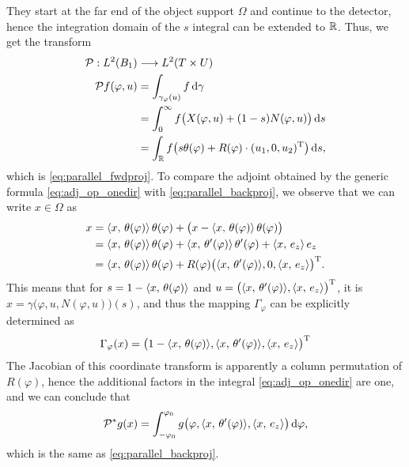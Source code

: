 \documentclass{amsart}
\renewcommand*{\phi}{\varphi}
\begin{document}
\begin{example}
\begin{equation*}
 \end{equation*}
 They start at the far end of the object support $\Omega$ and continue to the detector, hence the integration domain of the $s$ 
 integral can be extended to ${\mathbb{R}}$. Thus, we get the transform
 \begin{align*}
  \OPP: L^2(B_1) & \Lto L^2(T \times U) \\
  \OPP f(\phi, u) 
  &= \int_{\gamma_\phi(u)} f\, \D \gamma \\
  &= \int_0^\infty f\big(X(\phi, u) + (1-s) N(\phi, u)\big)\, \D s \\
  &= \int_\RR f\big(s \theta(\phi) + R(\phi) \cdot \TRANSP{(u_1, 0, u_2)}\big)\, \D s,
 \end{align*}
 which is \eqref{eq:parallel_fwdproj}. To compare the adjoint obtained by the generic formula \eqref{eq:adj_op_onedir} with 
 \eqref{eq:parallel_backproj}, we observe that we can write $x \in \Omega$ as
 \begin{align*}
  x 
  &= \INNER{x}{\theta(\phi)}\, \theta(\phi) + \big(x - \INNER{x}{\theta(\phi)}\, \theta(\phi)\big) \\
  &= \INNER{x}{\theta(\phi)}\, \theta(\phi) + \INNER{x}{\theta'(\phi)}\, \theta'(\phi) + \INNER{x}{e_z}\, e_z \\
  &= \INNER{x}{\theta(\phi)}\, \theta(\phi) + R(\phi) \TRANSP{\big(\INNER{x}{\theta'(\phi)}, 0, \INNER{x}{e_z}\big)}.
 \end{align*}
 This means that for $s = 1 - \INNER{x}{\theta(\phi)}$ and $u = \TRANSP{\big(\INNER{x}{\theta'(\phi)}, \INNER{x}{e_z}\big)}$, it is 
 $x = \gamma\big(\phi, u, N(\phi, u)\big)(s)$, and thus the mapping $\Gamma_\phi$ can be explicitly determined as
 \begin{equation*}
  \Gamma_\phi(x) = \TRANSP{\big(1 - \INNER{x}{\theta(\phi)}, \INNER{x}{\theta'(\phi)}, \INNER{x}{e_z}\big)}
 \end{equation*}
 The Jacobian of this coordinate transform is apparently a column permutation of $R(\phi)$, hence the additional factors in the integral 
 \eqref{eq:adj_op_onedir} are one, and we can conclude that
 \begin{equation*}
  \DUALOPP g(x) = \int_{-\phi_0}^{\phi_0} g\big(\phi, \INNER{x}{\theta'(\phi)}, \INNER{x}{e_z}\big)\, \D\phi,
 \end{equation*}
 which is the same as \eqref{eq:parallel_backproj}.
\end{example}
%
%
%
\end{document}
